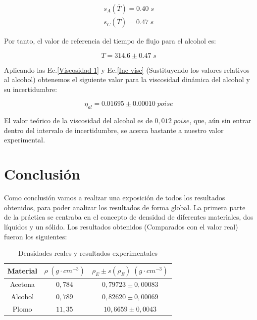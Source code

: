 \documentclass[a4paper,12pt,titlepage]{report}
\begin{document}
\begin{equation}
    \begin{gathered}
        s_A(\overline{T}) = 0.40 \; s \\
        s_C(\overline{T}) = 0.47 \; s
    \end{gathered}
\end{equation}

Por tanto, el valor de referencia del tiempo de flujo para el alcohol es:

\begin{equation}
    T = 314.6 \pm 0.47 \; s
\end{equation}

Aplicando las Ec.\ref{Viscosidad 1} y Ec.\ref{Inc visc} (Sustituyendo los valores relativos al alcohol) obtenemos el siguiente valor para la viscosidad dinámica del alcohol y su incertidumbre:

\begin{equation}
    \eta_{al} =  0.01695 \pm 0.00010 \; poise
\end{equation}

El valor teórico de la viscosidad del alcohol es de $0,012 \; poise$, que, aún sin entrar dentro del intervalo de incertidumbre, se acerca bastante a nuestro valor experimental.

\newpage

\section{Conclusión}

Como conclusión vamos a realizar una exposición de todos los resultados obtenidos, para poder analizar los resultados de forma global. La primera parte de la práctica se centraba en el concepto de densidad de diferentes materiales, dos líquidos y un sólido. Los resultados obtenidos (Comparados con el valor real) fueron los siguientes:


\begin{table}[h!]
    \centering
    \begin{tabular}{|c|c|c|}
        \hline
        Material & $\rho  \; (g \cdot cm^{-3})$ & $\rho _E\pm s(\rho_E) \; (g \cdot cm^{-3})$ \\ \hline
        Acetona &$0, 784$ & $0,79723 \pm 0,00083$ \\ \hline
        Alcohol & $0, 789$ & $0,82620 \pm  0,00069$\\ \hline
        Plomo & $11,35$ & $10,6659 \pm 0,0043$ \\ \hline
    \end{tabular}
    \caption{Densidades reales y resultados experimentales}
\end{table}
\end{document}
